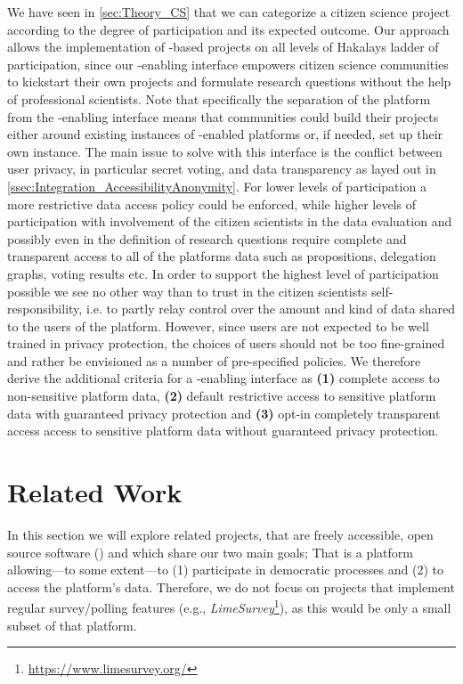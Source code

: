 We have seen in \ref{sec:Theory_CS} that we can categorize a citizen science project according to the degree of participation and its expected outcome.
Our approach allows the implementation of -based  projects on all levels of Hakalays ladder of participation, since our -enabling interface empowers citizen science communities to kickstart their own projects and formulate research questions without the help of professional scientists.
Note that specifically the separation of the  platform from the -enabling interface means that communities could build their  projects either around existing instances of -enabled  platforms or, if needed, set up their own instance.
The main issue to solve with this interface is the conflict between user privacy, in particular secret voting, and data transparency as layed out in \ref{ssec:Integration_AccessibilityAnonymity}.
For lower levels of participation a more restrictive data access policy could be enforced, while higher levels of participation with involvement of the citizen scientists in the data evaluation and possibly even in the definition of research questions require complete and transparent access to all of the platforms data such as propositions, delegation graphs, voting results etc.
In order to support the highest level of participation possible we see no other way than to trust in the citizen scientists self-responsibility, i.e. to partly relay control over the amount and kind of data shared to the users of the  platform.
However, since users are not expected to be well trained in privacy protection, the choices of users should not be too fine-grained and rather be envisioned as a number of pre-specified policies.
We therefore derive the additional criteria for a -enabling interface as \textbf{(1)} complete access to non-sensitive platform data, \textbf{(2)} default restrictive access to sensitive platform data with guaranteed privacy protection and \textbf{(3)} opt-in completely transparent access access to sensitive platform data without guaranteed privacy protection.

\section{Related Work}
\label{sec:RelatedWork}
  
In this section we will explore related projects, that are freely accessible, open source software () and which share our two main goals; That is a platform allowing---to some extent---to (1) participate in democratic processes and (2) to access the platform’s data. Therefore, we do not focus on projects that implement regular survey/polling features (e.g., \textit{LimeSurvey}\footnote{\url{https://www.limesurvey.org/}}), as this would be only a small subset of that platform.

